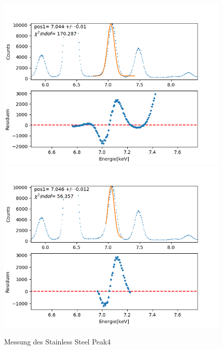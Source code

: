 \documentclass[12pt,a4paper]{article}
\begin{document}
\begin{figure}[H]
\centering
\includegraphics[scale=0.49]{Bilder/roentgen_spektren/stahl/rub4_1.png}
\includegraphics[scale=0.49]{Bilder/roentgen_spektren/stahl/rub4_2.png}
\caption{Messung des Stainless Steel Peak4}
\end{figure}
\end{document}
